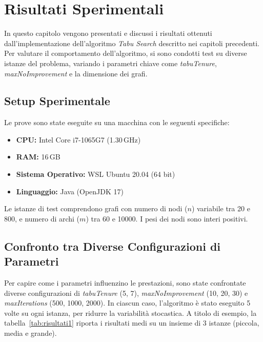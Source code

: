 \section{Risultati Sperimentali}
\label{sec:Risultati}

In questo capitolo vengono presentati e discussi i risultati ottenuti dall'implementazione dell'algoritmo \emph{Tabu Search} descritto nei capitoli precedenti. Per valutare il comportamento dell’algoritmo, si sono condotti test su diverse istanze del problema, variando i parametri chiave come \emph{tabuTenure}, \emph{maxNoImprovement} e la dimensione dei grafi.

\subsection{Setup Sperimentale}

Le prove sono state eseguite su una macchina con le seguenti specifiche:
\begin{itemize}
    \item \textbf{CPU:} Intel Core i7-1065G7 (1.30\,GHz)
    \item \textbf{RAM:} 16\,GB
    \item \textbf{Sistema Operativo:} WSL Ubuntu 20.04 (64 bit)
    \item \textbf{Linguaggio:} Java (OpenJDK 17)
\end{itemize}

Le istanze di test comprendono grafi con numero di nodi (\(n\)) variabile tra 20 e 800, e numero di archi (\(m\)) tra 60 e 10000. I pesi dei nodi sono interi positivi.

\subsection{Confronto tra Diverse Configurazioni di Parametri}

Per capire come i parametri influenzino le prestazioni, sono state confrontate diverse configurazioni di \emph{tabuTenure} (5, 7), \emph{maxNoImprovement} (10, 20, 30) e \emph{maxIterations} (500, 1000, 2000). In ciascun caso, l'algoritmo è stato eseguito 5 volte su ogni istanza, per ridurre la variabilità stocastica. A titolo di esempio, la tabella~\ref{tab:risultati1} riporta i risultati medi su un insieme di 3 istanze (piccola, media e grande).

